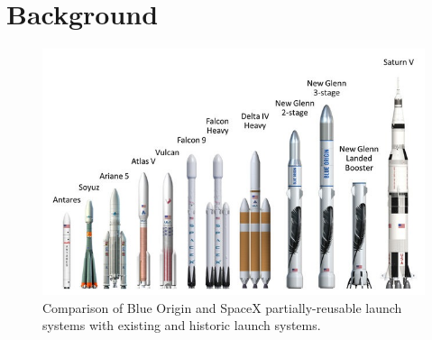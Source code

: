       
      
      \chapter{Background}
    
    
    
    
    
    
  
    
    \begin{figure}[ht]
    	\centering
    	\includegraphics[width=0.9\linewidth]{figures/2_literature-review/LaunchVehicles}
    	\caption{Comparison of Blue Origin and SpaceX partially-reusable launch systems with existing and historic launch systems\cite{BlueOrigin}.}
    	\label{fig:LaunchVehicles}
    \end{figure}
    
